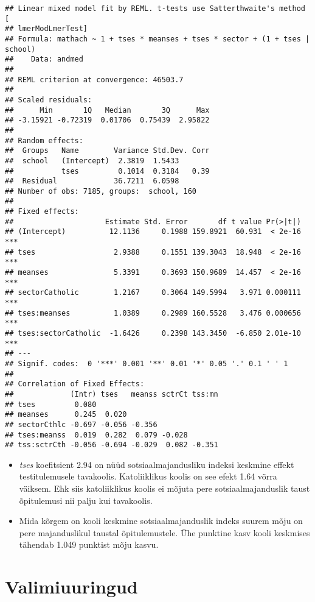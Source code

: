 \documentclass[
]{book}
\providecommand{\tightlist}{%
  \setlength{\itemsep}{0pt}\setlength{\parskip}{0pt}}
\begin{document}
\begin{verbatim}
## Linear mixed model fit by REML. t-tests use Satterthwaite's method [
## lmerModLmerTest]
## Formula: mathach ~ 1 + tses * meanses + tses * sector + (1 + tses | school)
##    Data: andmed
## 
## REML criterion at convergence: 46503.7
## 
## Scaled residuals: 
##      Min       1Q   Median       3Q      Max 
## -3.15921 -0.72319  0.01706  0.75439  2.95822 
## 
## Random effects:
##  Groups   Name        Variance Std.Dev. Corr
##  school   (Intercept)  2.3819  1.5433       
##           tses         0.1014  0.3184   0.39
##  Residual             36.7211  6.0598       
## Number of obs: 7185, groups:  school, 160
## 
## Fixed effects:
##                     Estimate Std. Error       df t value Pr(>|t|)    
## (Intercept)          12.1136     0.1988 159.8921  60.931  < 2e-16 ***
## tses                  2.9388     0.1551 139.3043  18.948  < 2e-16 ***
## meanses               5.3391     0.3693 150.9689  14.457  < 2e-16 ***
## sectorCatholic        1.2167     0.3064 149.5994   3.971 0.000111 ***
## tses:meanses          1.0389     0.2989 160.5528   3.476 0.000656 ***
## tses:sectorCatholic  -1.6426     0.2398 143.3450  -6.850 2.01e-10 ***
## ---
## Signif. codes:  0 '***' 0.001 '**' 0.01 '*' 0.05 '.' 0.1 ' ' 1
## 
## Correlation of Fixed Effects:
##             (Intr) tses   meanss sctrCt tss:mn
## tses         0.080                            
## meanses      0.245  0.020                     
## sectorCthlc -0.697 -0.056 -0.356              
## tses:meanss  0.019  0.282  0.079 -0.028       
## tss:sctrCth -0.056 -0.694 -0.029  0.082 -0.351
\end{verbatim}

\begin{itemize}
\tightlist
\item
  \emph{tses} koefitsient 2.94 on nüüd sotsiaalmajandusliku indeksi keskmine effekt testitulemusele tavakoolis. Katoliiklikus koolis on see efekt 1.64 võrra väiksem. Ehk siis katoliiklikus koolis ei mõjuta pere sotsiaalmajanduslik taust õpitulemusi nii palju kui tavakoolis.\\
\item
  Mida kõrgem on kooli keskmine sotsiaalmajanduslik indeks suurem mõju on pere majanduslikul taustal õpitulemustele. Ühe punktine kasv kooli keskmises tähendab 1.049 punktist mõju kasvu.
\end{itemize}

\hypertarget{part-valimiuuringud}{%
\part{Valimiuuringud}\label{part-valimiuuringud}}
\end{document}
